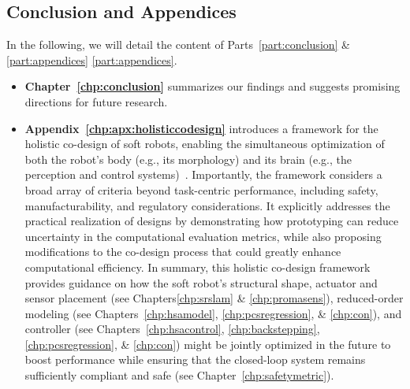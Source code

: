 \subsection*{Conclusion and Appendices}
In the following, we will detail the content of Parts~\ref{part:conclusion} \& \ref{part:appendices} \ref{part:appendices}.
\begin{itemize}
    \item \textbf{Chapter~\ref{chp:conclusion}} summarizes our findings and suggests promising directions for future research.
    \item 
    \textbf{Appendix~\ref{chp:apx:holisticcodesign}} introduces a framework for the holistic co-design of soft robots, enabling the simultaneous optimization of both the robot’s body (e.g., its morphology) and its brain (e.g., the perception and control systems)~\citep{spielberg2019learning, wang2024diffusebot, navez2024contributions}. Importantly, the framework considers a broad array of criteria beyond task-centric performance, including safety, manufacturability, and regulatory considerations. It explicitly addresses the practical realization of designs by demonstrating how prototyping can reduce uncertainty in the computational evaluation metrics, while also proposing modifications to the co-design process that could greatly enhance computational efficiency. In summary, this holistic co-design framework provides guidance on how the soft robot’s structural shape, actuator and sensor placement (see Chapters\ref{chp:srslam} \& \ref{chp:promasens}), reduced-order modeling (see Chapters~\ref{chp:hsamodel}, \ref{chp:pcsregression}, \& \ref{chp:con}), and controller (see Chapters~\ref{chp:hsacontrol}, \ref{chp:backstepping}, \ref{chp:pcsregression}, \& \ref{chp:con}) might be jointly optimized in the future to boost performance while ensuring that the closed-loop system remains sufficiently compliant and safe (see Chapter~\ref{chp:safetymetric}).

\end{itemize}

